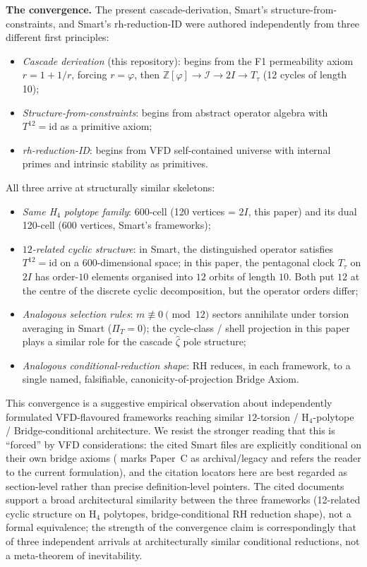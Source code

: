 \documentclass[11pt, a4paper]{amsart}
\theoremstyle{definition}
\begin{document}
\noindent\textbf{The convergence.} The present cascade-derivation,
Smart's structure-from-constraints, and Smart's rh-reduction-ID
were authored independently from three different first principles:

\begin{itemize}
\item \emph{Cascade derivation} (this repository): begins from the
F1 permeability axiom $r = 1 + 1/r$, forcing $r = \varphi$, then
$\mathbb{Z}[\varphi] \to \mathcal{I} \to 2I \to T_\tau$ (12 cycles
of length 10);
\item \emph{Structure-from-constraints}: begins from abstract operator
algebra with $T^{12} = \mathrm{id}$ as a primitive axiom;
\item \emph{rh-reduction-ID}: begins from VFD self-contained universe
with internal primes and intrinsic stability as primitives.
\end{itemize}

All three arrive at structurally similar skeletons:

\begin{itemize}
\item \emph{Same H$_4$ polytope family}: 600-cell (120 vertices = $2I$,
this paper) and its dual 120-cell (600 vertices, Smart's frameworks);
\item \emph{$12$-related cyclic structure}: in Smart, the
distinguished operator satisfies $T^{12} = \mathrm{id}$ on a
600-dimensional space; in this paper, the pentagonal clock $T_\tau$
on $2I$ has order-$10$ elements organised into $12$ orbits of
length $10$.  Both put $12$ at the centre of the discrete cyclic
decomposition, but the operator orders differ;
\item \emph{Analogous selection rules}: $m \not\equiv 0 \pmod{12}$
sectors annihilate under torsion averaging in Smart ($\Pi_T = 0$);
the cycle-class / shell projection in this paper plays a similar
role for the cascade $\widehat\zeta$ pole structure;
\item \emph{Analogous conditional-reduction shape}: RH reduces, in
each framework, to a single named, falsifiable,
canonicity-of-projection Bridge Axiom.
\end{itemize}

This convergence is a suggestive empirical observation about
independently formulated VFD-flavoured frameworks reaching similar
$12$-torsion / H$_4$-polytope / Bridge-conditional architecture.
We resist the stronger reading that this is ``forced'' by VFD
considerations: the cited Smart files are explicitly conditional
on their own bridge axioms (\cite{SmartPaperC} marks Paper~C as
archival/legacy and refers the reader to the current
\cite{SmartPaperII} formulation), and the citation locators here
are best regarded as section-level rather than precise
definition-level pointers.  The cited documents support a broad
architectural similarity between the three frameworks (12-related
cyclic structure on H$_4$ polytopes, bridge-conditional RH
reduction shape), not a formal equivalence; the strength of the
convergence claim is correspondingly that of three independent
arrivals at architecturally similar conditional reductions, not a
meta-theorem of inevitability.
\end{document}
